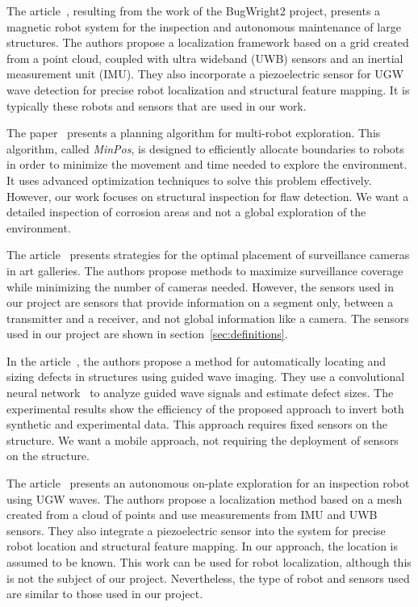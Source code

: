 \documentclass[english,RandD]{rapportPFE}  %
\begin{document}
		The article~\cite{s22093235}, resulting from the work of the BugWright2 project, presents a magnetic robot system for the inspection and autonomous maintenance of large structures.
		The authors propose a localization framework based on a grid created from a point cloud, coupled with ultra wideband (UWB) sensors and an inertial measurement unit (IMU).
		They also incorporate a piezoelectric sensor for UGW wave detection for precise robot localization and structural feature mapping.
		It is typically these robots and sensors that are used in our work.

		The paper~\cite{bautin:hal-00757960} presents a planning algorithm for multi-robot exploration.
		This algorithm, called \textit{MinPos}, is designed to efficiently allocate boundaries to robots in order to minimize the movement and time needed to explore the environment. It uses advanced optimization techniques to solve this problem effectively.
		However, our work focuses on structural inspection for flaw detection.
		We want a detailed inspection of corrosion areas and not a global exploration of the environment.

		The article~\cite{article455556} presents strategies for the optimal placement of surveillance cameras in art galleries.
		The authors propose methods to maximize surveillance coverage while minimizing the number of cameras needed.
		However, the sensors used in our project are sensors that provide information on a segment only, between a transmitter and a receiver, and not global information like a camera.
		The sensors used in our project are shown in section~\ref{sec:definitions}.

		In the article~\cite{articlesvsdf}, the authors propose a method for automatically locating and sizing defects in structures using guided wave imaging.
		They use a convolutional neural network~\cite{enwiki:1159408824} to analyze guided wave signals and estimate defect sizes.
		The experimental results show the efficiency of the proposed approach to invert both synthetic and experimental data.
		This approach requires fixed sensors on the structure.
		We want a mobile approach, not requiring the deployment of sensors on the structure.

		The article~\cite{9568841} presents an autonomous on-plate exploration for an inspection robot using UGW waves.
		The authors propose a localization method based on a mesh created from a cloud of points and use measurements from IMU and UWB sensors.
		They also integrate a piezoelectric sensor into the system for precise robot location and structural feature mapping.
		In our approach, the location is assumed to be known.
		This work can be used for robot localization, although this is not the subject of our project.
		Nevertheless, the type of robot and sensors used are similar to those used in our project.
\end{document}
